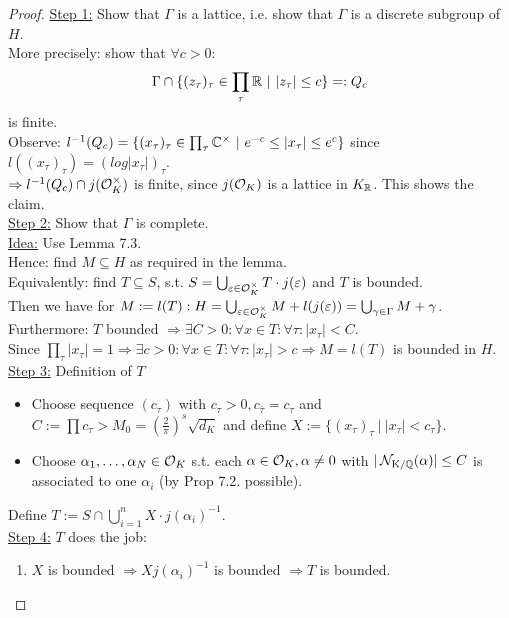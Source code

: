 \begin{proof}
\underline{Step 1:} Show that $\Gamma$ is a lattice, i.e. show that $\Gamma$ is a discrete subgroup of $H$.\\
More precisely: show that $\forall c > 0:$
\[ \Gamma \cap \{(z_\tau)_\tau \in \prod_\tau \mathbb{R} \ | \ |z_\tau| \leq c \} =: Q_c\]
is finite.\\
Observe: $l^{-1}(Q_c) = \{(x_\tau)_\tau \in \prod_\tau \mathbb{C}^\times \ | \ e^{-c} \leq |x_\tau| \leq e^c\}$ since $l((x_\tau)_\tau)=(log|x_\tau|)_\tau$.\\
$\Rightarrow l^{-1}(Q_c) \cap j(\mathcal{O}^\times_K)$ is finite, since $j(\mathcal{O}_K)$ is a lattice in $K_{\mathbb{R}}$. This shows the claim.\\
\underline{Step 2:} Show that $\Gamma$ is complete.\\
\underline{Idea:} Use Lemma 7.3.\\
Hence: find $M \subseteq H$ as required in the lemma.\\
Equivalently: find $T \subseteq S$, s.t. $S = \bigcup_{\varepsilon \in \mathcal{O}^\times_K} T\cdot j(\varepsilon)$ and $T$ is bounded.\\
Then we have for $M:= l(T): H= \bigcup_{\varepsilon \in \mathcal{O}^\times_K} M + l(j(\varepsilon)) = \bigcup_{\gamma \in \Gamma} M + \gamma$.\\
Furthermore: $T$ bounded $\Rightarrow \exists C >0 : \forall x \in T: \forall \tau: |x_\tau| <C$.\\
Since $\prod_\tau |x_\tau| =1 \Rightarrow \exists c >0: \forall x \in T: \forall \tau: | x_\tau| >c \Rightarrow M=l(T)$ is bounded in $H$.\\
\underline{Step 3:} Definition of $T$
\begin{itemize}
\item Choose sequence $(c_\tau)$ with $c_\tau >0, c_{\bar{\tau}}=c_\tau$ and $C:=\prod c_\tau >M_0= (\frac{2}{\pi})^s \sqrt{d_K}$ and define $X:= \{ (x_\tau)_\tau \ | \ | x_\tau| < c_\tau\}$.
\item Choose $\alpha_1, \dots, \alpha_N \in \mathcal{O}_K$ s.t. each $\alpha \in \mathcal{O}_K, \alpha \neq 0$ with $|\operatorname{\mathcal{N}_{K/\mathbb{Q}}}(\alpha)| \leq C$ is associated to one $\alpha_i$ (by Prop 7.2. possible).
\end{itemize}
Define $T:= S \cap \bigcup_{i=1}^n X \cdot j(\alpha_i)^{-1}$.\\
\underline{Step 4:} $T$ does the job:
\begin{enumerate}[(1)]
\item $X$ is bounded $\Rightarrow X j(\alpha_i)^{-1}$ is bounded $\Rightarrow T$ is bounded.

\end{enumerate}
\end{proof}
